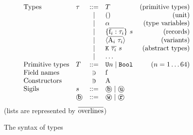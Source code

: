 
\begin{figure}
\[
\begin{array}{llclr}
  \text{Types} 
     & \tau & ::=  & T & \text{(primitive types)} \\
     &      & \mid & ()                & \text{(unit)} \\
     &      & \mid & \alpha            & \text{(type variables)} \\
     &      & \mid &\{ \overline{\mathrm{f}_i : \tau_i} \}\ s & \text{(records)}\\
     &      & \mid & \langle \overline{\mathrm{A}_i\ \tau_i} \rangle  & \text{{(variants)}}\\
     &      & \mid & \texttt{K}\ \overline{{\tau_i}}\ s  & \text{(abstract types)} \\
     &      & \mid & \dots & \\
  \text{Primitive types} & T & ::= & \texttt{U}n \mid \texttt{Bool} & \text{($n = 1 \dots 64$)} \\
  \text{Field names}  & & \ni  & \mathrm{f}\\
  \text{Constructors} & & \ni  & \mathrm{A}\\
  \text{Sigils} & s & ::= & \text{\textcircled{\texttt{b}}} \mid \text{\textcircled{\texttt{u}}} & \\
                & \text{\textcircled{\texttt{b}}} & ::= & \text{\textcircled{\texttt{w}}} \mid \text{\textcircled{\texttt{r}}} & 
\end{array}
\]
(lists are represented by $\overline{\text{overlines}}$)
\caption{The syntax of \cogent types}
\label{fig:syntax-cogent-types}
\end{figure}

